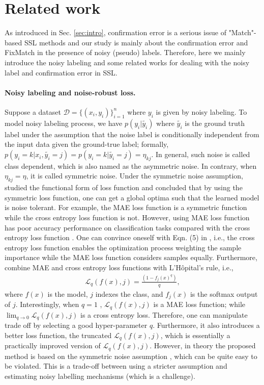 \section{Related work} \label{sec:related_work}
As introduced in Sec. \ref{sec:intro}, confirmation error is a serious issue of "Match"-based SSL methods and our study is mainly about the confirmation error and FixMatch in the presence of noisy (pseudo) labels. Therefore, here we mainly introduce the noisy labeling and some related works for dealing with the noisy label and confirmation error in SSL.

\paragraph{Noisy labeling and noise-robust loss.}
Suppose a dataset $\mathcal{D} = \{(x_i,y_i)\}^n_{i=1}$ where $y_i$ is given by noisy labeling. To model noisy labeling process, we have $p(y_i | \widetilde{y_i})$ where $\widetilde{y_i}$ is the ground truth label under the assumption that the noise label is conditionally independent from the input data given the ground-true label; formally, $p(y_i = k | x_i, \widetilde{y_i}=j) = p(y_i=k | \widetilde{y_i}=j) = \eta_{kj}.$ In general, such noise is called class dependent, which is also named as the asymmetric noise\citep{zhang2018generalized}. In contrary, when $\eta_{kj} = \eta$, it is called symmetric noise. Under the symmetric noise assumption, \citet{ghosh2015making} studied the functional form of loss function and concluded that by using the symmetric loss function, one can get a global optima such that the learned model is noise tolerant. For example, the MAE loss function is a symmetric function while the cross entropy loss function is not. However, using MAE loss function has poor accuracy performance on classification tasks compared with the cross entropy loss function \citep{zhang2018generalized}. One can convince oneself with Eqn. (5) in \citep{zhang2018generalized}, i.e., the cross entropy loss function enables the optimization process weighting the sample importance while the MAE loss function considers samples equally. Furthermore, \citet{zhang2018generalized} combine MAE and cross entropy loss functions with L’Hôpital’s rule, i.e., 
\begin{eqnarray}
\mathcal{L}_q(f(x),j) =\frac{(1-f_j(x)^q)}{q},\label{eq:nrloss}
\end{eqnarray}
where $f(x)$ is the model, $j$ indexes the class, and $f_j(x)$ is the softmax output of $j$. Interestingly, when $q=1$ , $\mathcal{L}_q(f(x),j)$ is a MAE loss function; while $\lim_{q\to 0}\mathcal{L}_q(f(x),j)$ is a cross entropy loss. Therefore, one can manipulate trade off by selecting a good  hyper-parameter $q$. Furthermore, it also introduces a better loss function, the truncated $\mathcal{L}_q(f(x),j)$, which is essentially a practically improved version of  $\mathcal{L}_q(f(x),j)$. However, in theory the proposed method is based on the symmetric noise assumption \citep{zhang2018generalized}, which can be quite easy to be violated. This is a trade-off between using a stricter assumption and estimating noisy labelling mechanisms \citep{patrini2017making} (which is a challenge).

